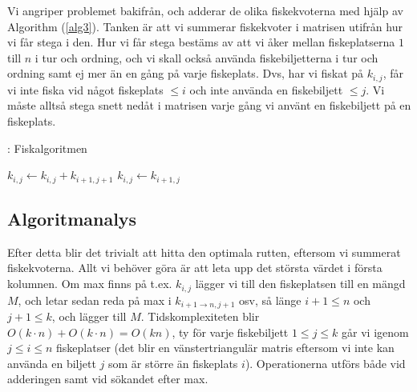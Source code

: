 \documentclass[11pt]{exam}
\begin{document}
Vi angriper problemet bakifrån, och adderar de olika fiskekvoterna med hjälp av Algorithm (\ref{alg3}). Tanken är att vi summerar fiskekvoter i matrisen utifrån hur vi får stega i den. Hur vi får stega bestäms av att vi åker mellan fiskeplatserna $1$ till $n$ i tur och ordning, och vi skall också använda fiskebiljetterna i tur och ordning samt ej mer än en gång på varje fiskeplats. Dvs, har vi fiskat på $k_{i,j}$, får vi inte fiska vid något fiskeplats $\leq i$ och inte använda en fiskebiljett $\leq j$. Vi måste alltså stega snett nedåt i matrisen varje gång vi använt en fiskebiljett på en fiskeplats. 

\begin{algorithm}
	\caption{: Fiskalgoritmen}
	\label{alg3}
	\begin{algorithmic} [1]
					\STATE $k_{i,j} \leftarrow k_{i,j} + k_{i+1,j+1}$
				\ELSE
					\STATE $k_{i,j} \leftarrow k_{i+1,j}$
				\ENDIF
			\ENDFOR
		\ENDFOR
	\end{algorithmic}
\end{algorithm}

\subsection{Algoritmanalys}
Efter detta blir det trivialt att hitta den optimala rutten, eftersom vi summerat fiskekvoterna. Allt vi behöver göra är att leta upp det största värdet i första kolumnen. Om max finns på t.ex. $k_{i,j}$ lägger vi till den fiskeplatsen till en mängd $M$, och letar sedan reda på max i $k_{i+1\rightarrow n,j+1}$ osv, så länge $i + 1 \leq n$ och $j + 1 \leq k$, och lägger till $M$. Tidskomplexiteten blir $O(k\cdot n) + O(k\cdot n) = O(kn)$, ty för varje fiskebiljett $1 \leq j \leq k$ går vi igenom $j \leq i \leq n$ fiskeplatser (det blir en vänstertriangulär matris eftersom vi inte kan använda en biljett $j$ som är större än fiskeplats $i$). Operationerna utförs både vid adderingen samt vid sökandet efter max.
\end{document}
